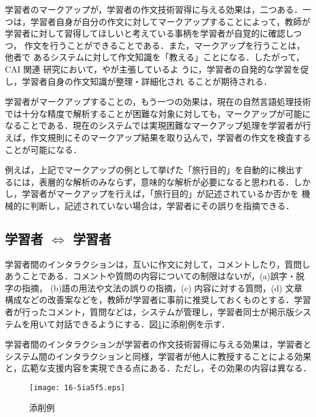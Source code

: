 \documentclass[japanese]{jnlp_1.4}
\begin{document}
学習者のマークアップが，学習者の作文技術習得に与える効果は，二つある．一
つは，学習者自身が自分の作文に対してマークアップすることによって，教師が
学習者に対して習得してほしいと考えている事柄を学習者が自覚的に確認しつつ，
作文を行うことができることである．また，マークアップを行うことは，他者で
あるシステムに対して作文知識を「教える」ことになる．したがって，CAI 関連
研究において，\cite{kotani1989}や\cite{大林史明:20001215}が主張しているよ
うに，学習者の自発的な学習を促し，学習者自身の作文知識が整理・詳細化され
ることが期待される．

学習者がマークアップすることの，もう一つの効果は，現在の自然言語処理技術
では十分な精度で解析することが困難な対象に対しても，マークアップが可能に
なることである．現在のシステムでは実現困難なマークアップ処理を学習者が行
えば，作文規則にそのマークアップ結果を取り込んで，学習者の作文を検査する
ことが可能になる．

例えば，上記でマークアップの例として挙げた「旅行目的」を自動的に検出す
るには，表層的な解析のみならず，意味的な解析が必要になると思われる．しか
し，学習者がマークアップを行えば，「旅行目的」が記述されているか否かを
機械的に判断し，記述されていない場合は，学習者にその誤りを指摘できる．



\subsection{学習者 $\Leftrightarrow$ 学習者}
学習者間のインタラクションは，互いに作文に対して，コメントしたり，質問し
あうことである．コメントや質問の内容についての制限はないが，(a)誤字・脱
字の指摘， (b)語の用法や文法の誤りの指摘，(c) 内容に対する質問，(d) 文章
構成などの改善案などを，教師が学習者に事前に推奨しておくものとする．学習
者が行ったコメント，質問などは，システムが管理し，学習者同士が掲示版シス
テムを用いて対話できるようにする．図\ref{fig:correction}に添削例を示す．

学習者間のインタラクションが学習者の作文技術習得に与える効果は，学習者と
システム間のインタラクションと同様，学習者が他人に教授することによる効果
と，広範な支援内容を実現できる点にある．ただし，その効果の内容は異なる．

\begin{figure}[b]
 \begin{center}
  \texttt{[image: 16-5ia5f5.eps]}
  \caption{添削例}
  \label{fig:correction}
 \end{center}   
\end{figure}
\end{document}
